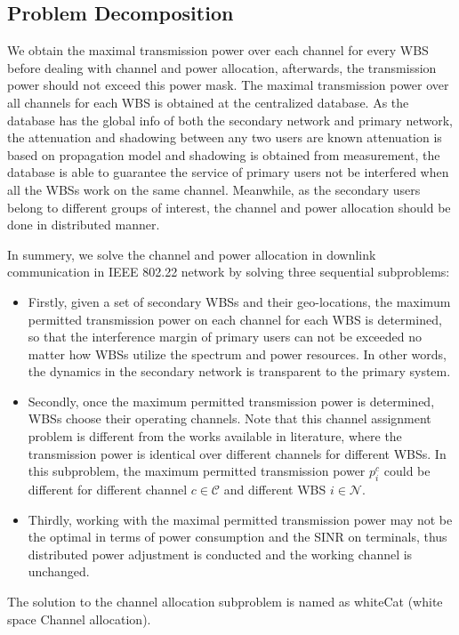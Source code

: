 \subsection{Problem Decomposition}
We obtain the maximal transmission power over each channel for every WBS before dealing with channel and power allocation, afterwards, the transmission power should not exceed this power mask.
The maximal transmission power over all channels for each WBS is obtained at the centralized database.
As the database has the global info of both the secondary network and primary network, the attenuation and shadowing between any two users are known \ie attenuation is based on propagation model and shadowing is obtained from measurement, the database is able to guarantee the service of primary users not be interfered when all the WBSs work on the same channel.
Meanwhile, as the secondary users belong to different groups of interest, the channel and power allocation should be done in distributed manner.

In summery, we solve the channel and power allocation in downlink communication in IEEE 802.22 network by solving three sequential subproblems:
\begin{itemize}
\item  Firstly, given a set of secondary WBSs and their geo-locations, the maximum permitted transmission power on each channel for each WBS is determined, so that the interference margin of primary users can not be exceeded no matter how WBSs utilize the spectrum and power resources.
In other words, the dynamics in the secondary network is transparent to the primary system. 
\item Secondly, once the maximum permitted transmission power is determined, WBSs choose their operating channels.
Note that this channel assignment problem is different from the works available in literature, where the transmission power is identical over different channels for different WBSs.
In this subproblem, the maximum permitted transmission power $p_i^c$ could be different for different channel $c\in \mathcal{C}$ and different WBS $i\in \mathcal{N}$.
\item Thirdly, working with the maximal permitted transmission power may not be the optimal in terms of power consumption and the SINR on terminals, thus distributed power adjustment is conducted and the working channel is unchanged.
\end{itemize}
The solution to the channel allocation subproblem is named as \gls{whiteCat} (white space Channel allocation).

